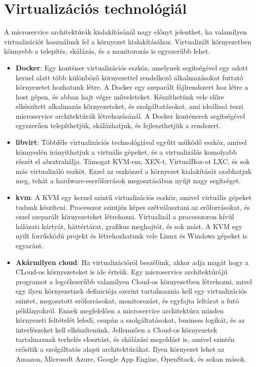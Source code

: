 \documentclass[11pt,magyar,a4paper,oneside,]{report}
\begin{document}
\section{Virtualizációs
technológiál}\label{virtualizuxe1ciuxf3s-technoluxf3giuxe1l}

A microservice architektúrák kialakításánál nagy előnyt jelenthet, ha
valamilyen virtualizációt használunk fel a környezet kialakításához.
Virtualizált környezetben könnyebb a telepítés, skálázás, és a
monitorozás is egyszerűbb lehet.

\begin{itemize}
\item
  \textbf{Docker}\citep{docker}: Egy konténer virtualizációs eszköz,
  amelynek segítségével egy adott kernel alatt több különböző
  környezettel rendelkező alkalmazásokat futtató környezetet hozhatunk
  létre. A Docker egy szeparált fájlrendszert hoz létre a host gépen, és
  abban hajt végre műveleteket. Készíthetünk vele előre elkészített
  alkalmazás környezeteket, és szolgáltatásokat, ami ideálissá teszi
  microservice architektúrák létrehozásánál. A Docker konténerek
  segítségével egyszerűen telepíthetjük, skálázhatjuk, és fejleszthetjük
  a rendszert.
\item
  \textbf{libvirt}\citep{libvirt}: Többféle virtualizációs
  technológiával egyűtt működő eszköz, amivel könnyedén irányíthatjuk a
  virtuális gépeket, és a virtualizálás komolyabb részét el
  absztrahálja. Támogat KVM-em, XEN-t, VirtualBox-ot LXC, és sok más
  virtualizáló eszköt. Ezzel az eszközzel a környezet kialakítását
  szabhatjuk meg, tehát a hardware-eserőforrások megosztásában nyújt
  nagy segítséget.
\item
  \textbf{kvm}\citep{kvm}: A KVM egy kernel szintű virtualizációs
  eszköz, amivel virtuális gépeket tudunk készíteni. Processzor szintjén
  képes szétválasztani az erőforrásokat, és ezzel szeparált
  környezeteket létrehozni. Virtualizál a processzoron kívül hálózati
  kártyát, háttértárat, grafikus meghajtót, és sok mást. A KVM egy nyilt
  forrűskódú projekt és létrehozhatunk vele Linux és Windows gépeket is
  egyaránt.
\item
  \textbf{Akármilyen cloud}: Ha virtualizációról beszélünk, akkor adja
  magát hogy a CLoud-os környezeteket is ide értsük. Egy microservice
  architektúrájú programot a legcélszerűbb valamilyen Cloud-os
  környezetben létrehozni, mivel egy ilyen környezetnek definiciója
  szerint tartalmaznia kell egy virtualizációs szintet, megosztott
  erőforrásokat, monitorozást, és egyfajta leltárat a futó példányokról.
  Ennek megfelelően a microservice architektúra minden környezeti
  feltételét lefedi, csupán a szolgáltatásokat, business logikát, és az
  interfészeket kell elkészítenünk. Jellemzően a Cloud-os környezetek
  tartalmaznak terhelés elosztást, és skálázási megoldást is, amivel
  szintén erősítik a szolgáltatás alapú architektúrákat. Ilyen környezet
  lehet az Amazon, Microsoft Azure, Google App Engine, OpenStack, és
  sokan mások.
\end{itemize}
\end{document}
